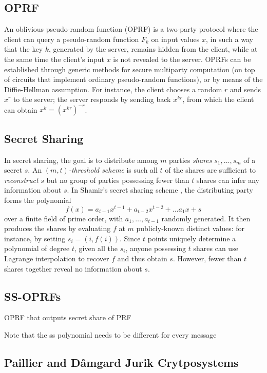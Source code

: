 \subsection{OPRF}

An oblivious pseudo-random function (OPRF) \cite{OPRF,OT_Ext} is
a two-party protocol where the client can query a pseudo-random function
$F_{k}$ on input values $x$, in such a way that the key $k$, generated
by the server, remains hidden from the client, while at the same time
the client's input $x$ is not revealed to the server. OPRFs can be
established through generic methods for secure multiparty computation
(on top of circuits that implement ordinary pseudo-random functions),
or by means of the Diffie-Hellman assumption. For instance, the client
chooses a random $r$ and sends $x^{r}$ to the server; the server
responds by sending back $x^{kr}$, from which the client can obtain
$x^{k}=(x^{kr})^{-r}$.

\subsection{Secret Sharing}

In secret sharing, the goal is to distribute among $m$ parties \emph{shares
}$s_{1},\ldots,s_{m}$ of a secret $s$. An \emph{$(m,t)$-threshold
scheme} is such all $t$ of the shares are sufficient to \emph{reconstruct
}$s$ but no group of parties possessing fewer than $t$ shares can
infer any information about $s$. In Shamir's secret sharing scheme
\cite{Shamir}, the distributing party forms the polynomial 
\[
f(x)=a_{t-1}x^{t-1}+a_{t-2}x^{t-2}+\ldots a_{1}x+s
\]
over a finite field of prime order, with $a_{1},\ldots,a_{t-1}$ randomly
generated. It then produces the shares by evaluating $f$ at $m$
publicly-known distinct values: for instance, by setting $s_{i}=(i,f(i))$.
Since $t$ points uniquely determine a polynomial of degree $t$,
given all the $s_{i}$, anyone possessing $t$ shares can use Lagrange
interpolation to recover $f$ and thus obtain $s$. However, fewer
than $t$ shares together reveal no information about $s$.

\subsection{SS-OPRFs}

OPRF that outputs secret share of PRF

Note that the ss polynomial needs to be different for every message

\subsection{Paillier and D\aa mgard Jurik Crytposystems}

